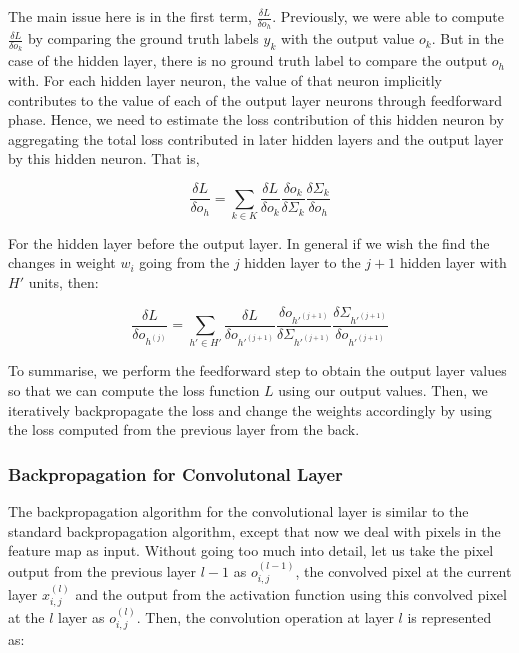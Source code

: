 \documentclass[12pt]{article}
\begin{document}
The main issue here is in the first term, $ \frac{\delta L}{\delta o_h}$. Previously, we were able to compute  $\frac{\delta L}{\delta o_k}$ by comparing the ground truth labels $y_k$ with the output value $o_k$. But in the case of the hidden layer, there is no ground truth label to compare the output $o_h$ with. For each hidden layer neuron, the value of that neuron implicitly contributes to the value of  each of the output layer neurons through feedforward phase. Hence, we need to estimate the loss contribution of this hidden neuron by aggregating the total loss contributed in later hidden layers and the output layer by this hidden neuron. That is,

\begin{equation*}
\frac{\delta L}{\delta o_h} = \sum_{k \in K} \frac{\delta L}{\delta o_k} \frac{\delta o_k}{\delta \Sigma_k} \frac{\delta \Sigma_k}{\delta o_h} 
\end{equation*}

For the hidden layer before the output layer. In general if we wish the find the changes in weight $w_i$ going from the $j$ hidden layer to the $j + 1$ hidden layer with $H'$ units, then:
 
\begin{equation*}
\frac{\delta L}{\delta o_{h^{(j)}}} = \sum_{h' \in H'} \frac{\delta L}{\delta o_{h'^{(j+1)}}} \frac{\delta o_{h'^{(j+1)}}}{\delta \Sigma_{h'^{(j+1)}}} \frac{\delta \Sigma_{h'^{(j+1)}}}{\delta o_{h'^{(j+1)}}} 
\end{equation*}

To summarise, we perform the feedforward step to obtain the output layer values so that we can compute the loss function $L$ using our output values. Then, we iteratively backpropagate the loss and change the weights accordingly by using the loss computed from the previous layer from the back.

\subsubsection{Backpropagation for Convolutonal Layer}

The backpropagation algorithm for the convolutional layer is similar to the standard backpropagation algorithm, except that now we deal with pixels in the feature map as input. Without going too much into detail, let us take the pixel output from the previous layer $l - 1$ as $o^{(l - 1)}_{i, j}$, the convolved pixel at the current layer $x^{(l)}_{i,j}$ and the output from the activation function using this convolved pixel at the $l$ layer as $o^{(l)}_{i,j}$. Then, the convolution operation at layer $l$ is represented as:
\end{document}
